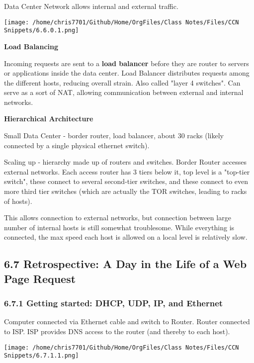 \documentclass[11pt]{article}
\begin{document}
Data Center Network allows internal and external traffic.

\begin{figure*}
\centering
\texttt{[image: /home/chris7701/Github/Home/OrgFiles/Class Notes/Files/CCN Snippets/6.6.0.1.png]}
\end{figure*}

\textbf{Load Balancing}

Incoming requests are sent to a \textbf{load balancer} before they are router to servers or applications inside the data center. Load Balancer distributes requests among the different hosts, reducing overall strain. Also called "layer 4 switches". Can serve as a sort of NAT, allowing communication between external and internal networks.

\textbf{Hierarchical Architecture}

Small Data Center - border router, load balancer, about 30 racks (likely connected by a single physical ethernet switch).

Scaling up - hierarchy made up of routers and switches.
Border Router accesses external networks.
Each access router has 3 tiers below it, top level is a "top-tier switch", these connect to several second-tier switches, and these connect to even more third tier switches (which are actually the TOR switches, leading to racks of hosts).

This allows connection to external networks, but connection between large number of internal hosts is still somewhat troublesome. While everything is connected, the max speed each host is allowed on a local level is relatively slow. 

\subsection{6.7 Retrospective: A Day in the Life of a Web Page Request}
\label{sec:org9ea045a}

\subsubsection{6.7.1 Getting started: DHCP, UDP, IP, and Ethernet}
\label{sec:org813db22}

Computer connected via Ethernet cable and switch to Router.
Router connected to ISP.
ISP provides DNS access to the router (and thereby to each host).


\begin{figure*}
\centering
\texttt{[image: /home/chris7701/Github/Home/OrgFiles/Class Notes/Files/CCN Snippets/6.7.1.1.png]}
\end{figure*}
\end{document}
